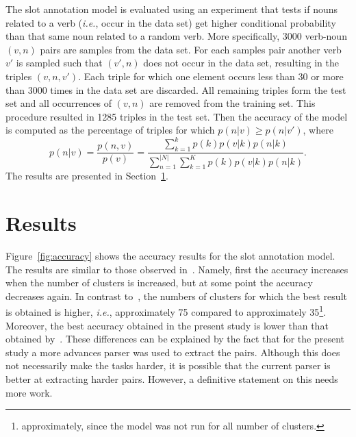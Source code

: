 \documentclass[11pt]{scrartcl}
\newcommand{\ie}{\textit{i.e.}}
\begin{document}
The slot annotation model is evaluated using an experiment that tests
if nouns related to a verb (\ie, occur in the data set) get higher
conditional probability than that same noun related to a random
verb. More specifically, 3000 verb-noun $(v, n)$ pairs are samples
from the data set. For each samples pair another verb $v'$ is sampled
such that $(v', n)$ does not occur in the data set, resulting in the
triples $(v, n , v')$. Each triple for which one element occurs less
than 30 or more than 3000 times in the data set are discarded. All
remaining triples form the test set and all occurrences of $(v, n)$
are removed from the training set. This procedure resulted in 1285
triples in the test set. Then the accuracy of the model is computed as
the percentage of triples for which $p(n|v) \ge p(n|v')$, where
\[
  p(n|v) = \frac{p(n, v)}{p(v)} =
  \frac{\sum_{k=1}^k p(k)p(v|k)p(n|k)}{\sum_{n=1}^{|N|}\sum_{k=1}^K p(k)p(v|k)p(n|k)}.
\]
The results are presented in Section~\ref{sec:results}.

\section{Results} %
\label{sec:results}
Figure~\ref{fig:accuracy} shows the accuracy results for the slot
annotation model. The results are similar to those observed
in~\cite{rooth1999inducing}. Namely, first the accuracy increases when
the number of clusters is increased, but at some point the accuracy
decreases again. In contrast to~\cite{rooth1999inducing}, the numbers
of clusters for which the best result is obtained is higher, \ie,
approximately 75 compared to approximately 35\footnote{approximately,
since the model was not run for all number of clusters.}. Moreover,
the best accuracy obtained in the present study is lower than that
obtained by~\cite{rooth1999inducing}. These differences can be
explained by the fact that for the present study a more advances
parser was used to extract the pairs. Although this does not
necessarily make the tasks harder, it is possible that the current
parser is better at extracting harder pairs. However, a definitive
statement on this needs more work.
\end{document}
